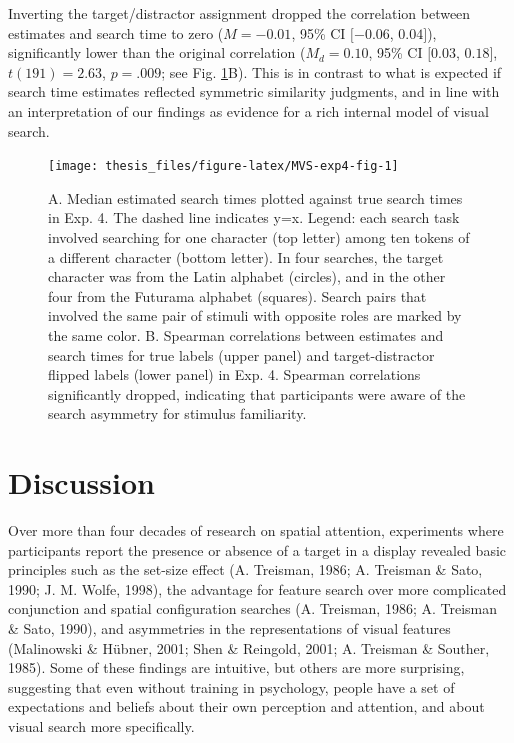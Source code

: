 \documentclass[12pt,twoside]{reedthesis}
\begin{document}
Inverting the target/distractor assignment dropped the correlation between estimates and search time to zero (\(M = -0.01\), 95\% CI \([-0.06\), \(0.04]\)), significantly lower than the original correlation (\(M_d = 0.10\), 95\% CI \([0.03\), \(0.18]\), \(t(191) = 2.63\), \(p = .009\); see Fig. \ref{fig:MVS-exp4-fig}B). This is in contrast to what is expected if search time estimates reflected symmetric similarity judgments, and in line with an interpretation of our findings as evidence for a rich internal model of visual search.
\begin{figure}
\texttt{[image: thesis\_files/figure-latex/MVS-exp4-fig-1]} \caption[Search time estimates accuracy and effect of search asymmetry, Experiment 4]{A. Median estimated search times plotted against true search times in Exp. 4. The dashed line indicates y=x. Legend: each search task involved searching for one character (top letter) among ten tokens of a different character (bottom letter). In four searches, the target character was from the Latin alphabet (circles), and in the other four from the Futurama alphabet (squares). Search pairs that involved the same pair of stimuli with opposite roles are marked by the same color. B. Spearman correlations between estimates and search times for true labels (upper panel) and target-distractor flipped labels (lower panel) in Exp. 4. Spearman correlations significantly dropped, indicating that participants were aware of the search asymmetry for stimulus familiarity.}\label{fig:MVS-exp4-fig}
\end{figure}
\hypertarget{discussion-1}{%
\section{Discussion}\label{discussion-1}}

Over more than four decades of research on spatial attention, experiments where participants report the presence or absence of a target in a display revealed basic principles such as the set-size effect (A. Treisman, 1986; A. Treisman \& Sato, 1990; J. M. Wolfe, 1998), the advantage for feature search over more complicated conjunction and spatial configuration searches (A. Treisman, 1986; A. Treisman \& Sato, 1990), and asymmetries in the representations of visual features (Malinowski \& Hübner, 2001; Shen \& Reingold, 2001; A. Treisman \& Souther, 1985). Some of these findings are intuitive, but others are more surprising, suggesting that even without training in psychology, people have a set of expectations and beliefs about their own perception and attention, and about visual search more specifically.
\end{document}

